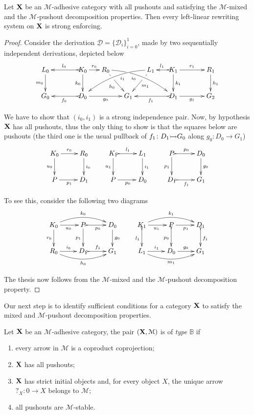 \documentclass[a4paper,UKenglish,cleveref,pdftex,thm-restate,numberwithinsect]{lipics-v2021}
\newcommand{\mto}[0]{\scalebox{1}{$\rightarrowtail$}}
\def\X{\textbf {\textup{X}}}
\def\G{\textbf {\textup{G}}}
\newcommand{\dder}[1]{\mathscr{#1}}
\newcommand{\der}[1]{\underline{\dder{#1}}}
\begin{document}
\begin{theorem}\label{thm:good1}Let $\X$ be an $\mathcal{M}$-adhesive category with all pushouts and satisfying the $\mathcal{M}$-mixed and the $\mathcal{M}$-pushout decomposition properties. Then every left-linear rewriting system on $\X$ is strong enforcing.
\end{theorem}
\begin{proof}
	Consider the derivation $\der{D}=\{\dder{D}_i\}_{i=0}^1$, made by two sequentially independent derivations, depicted below
	\[\xymatrix@C=15pt{L_0 \ar[d]_{m_0}&& K_0 \ar[d]_{k_0}\ar@{>->}[ll]_{l_0} \ar[r]^{r_0} & R_0 \ar@/^.35cm/[drrr]|(.3)\hole_(.4){i_0} \ar[dr]|(.3)\hole_{h_0} && L_1 \ar@/_.35cm/[dlll]^(.4){i_1} \ar[dl]|(.3)\hole^{m_1}& K_1 \ar[d]^{k_1}\ar@{>->}[l]_{l_1} \ar[rr]^{r_1} && R_1 \ar[d]^{h_1} \\G_0 && \ar@{>->}[ll]^{f_0} D_0 \ar[rr]_{g_0}&& G_1  && \ar@{>->}[ll]^{f_1} D_1 \ar[rr]_{g_1}&& G_2 }\]

	We have to show that $(i_0, i_1)$ is a strong independence pair. Now, by hypothesis $\X$ has all pushouts, thus the only thing to show is that the squares below are pushouts (the third one is the usual pullback of $f_1\colon D_1\mto G_0$ along $g_0\colon D_0\to G_1$)
	\[\xymatrix{K_0 \ar[r]^{r_0}  \ar[d]_{u_0}& R_0 \ar[d]^{i_0} & K_1 \ar@{>->}[r]^{l_1}  \ar[d]_{u_1}& L_1 \ar[d]^{i_1}&P \ar@{>->}[r]^{p_0} \ar[d]_{p_1}& D_0\ar[d]^{g_0} \\ P \ar[r]_{p_1} & D_1 &P \ar[r]_{p_0}  & D_0&D_1 \ar@{>->}[r]_{f_1} & G_1}\]

	To see this, consider the following two diagrams
	\[\xymatrix{K_0 \ar@/^.4cm/[rr]^{k_0} \ar[d]_{r_0} \ar[r]_{u_0}& \ar@{>->}[r]_{p_0} P \ar[d]_{p_1}& D_0 \ar[d]^{g_0}&K_1 \ar@/^.4cm/[rr]^{k_1} \ar@{>->}[d]_{l_1} \ar[r]_{u_1}& \ar[r]_{p_1} P \ar@{>->}[d]_{p_0}& D_1 \ar@{>->}[d]^{f_1}\\ R_0 \ar@/_.4cm/[rr]_{h_0}  \ar[r]^{i_0}& D_1 \ar@{>->}[r]^{f_1}& G_1 &L_1 \ar@/_.4cm/[rr]_{m_1}  \ar[r]^{i_1}& D_0 \ar[r]^{g_0}& G_1}\]

	The thesis now follows from the $\mathcal{M}$-mixed and the $\mathcal{M}$-pushout decomposition property.
\end{proof}

Our next step is to identify sufficient conditions for a category $\X$ to satisfy the mixed and $\mathcal{M}$-pushout decomposition properties.

\begin{definition} 
	Let $\X$ be an  $\mathcal{M}$-adhesive category, the pair $(\X, \mathcal{M})$ is of \emph{type $\mathbb{B}$} if
	\begin{enumerate}
		\item every arrow in $\mathcal{M}$ is a coproduct coprojection;
		\item $\X$ has all pushouts;
		\item $\X$ has strict initial objects and, for every object $X$, the unique arrow $?_X\colon 0\to X $ belongs to $\mathcal{M}$;
		\item all pushouts are $\mathcal{M}$-stable.
	\end{enumerate}
\end{definition}
\end{document}
